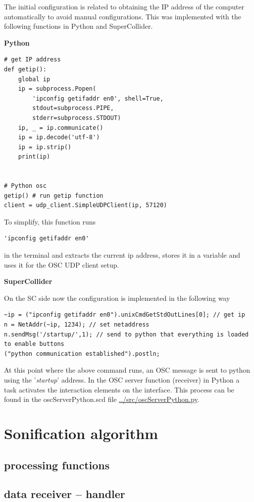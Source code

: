\documentclass[11pt]{article}
\begin{document}
The initial configuration is related to obtaining the IP address of the computer automatically to avoid manual configurations.  This was implemented with the following functions in Python and SuperCollider.

\textbf{Python}

\begin{verbatim}
# get IP address
def getip():
    global ip
    ip = subprocess.Popen(
        'ipconfig getifaddr en0', shell=True,
        stdout=subprocess.PIPE,
        stderr=subprocess.STDOUT)
    ip, _ = ip.communicate()
    ip = ip.decode('utf-8')
    ip = ip.strip()
    print(ip)


# Python osc
getip() # run getip function
client = udp_client.SimpleUDPClient(ip, 57120)
\end{verbatim}

To simplify, this function runs
\begin{verbatim}
'ipconfig getifaddr en0'
\end{verbatim}
in the terminal and extracts the current ip address, stores it in a variable and uses it for the OSC UDP client setup.

\textbf{SuperCollider}

On the SC side now the configuration is implemented in the following way
\begin{verbatim}
~ip = ("ipconfig getifaddr en0").unixCmdGetStdOutLines[0]; // get ip
n = NetAddr(~ip, 1234); // set netaddress
n.sendMsg('/startup/',1); // send to python that everything is loaded to enable buttons
("python communication established").postln;
\end{verbatim}

At this point where the above command runs, an OSC message is sent to python using the '\emph{startup}' address.  In the OSC server function (receiver) in Python a task activates the interaction elements on the interface.  This process can be found in the oscServerPython.scd file \url{../src/oscServerPython.py}.


\section{Sonification algorithm}
\label{sec:org838b6e7}
\subsection{processing functions}
\label{sec:org08667cf}
\subsection{data receiver -- handler}
\label{sec:org325d2ce}
\end{document}
